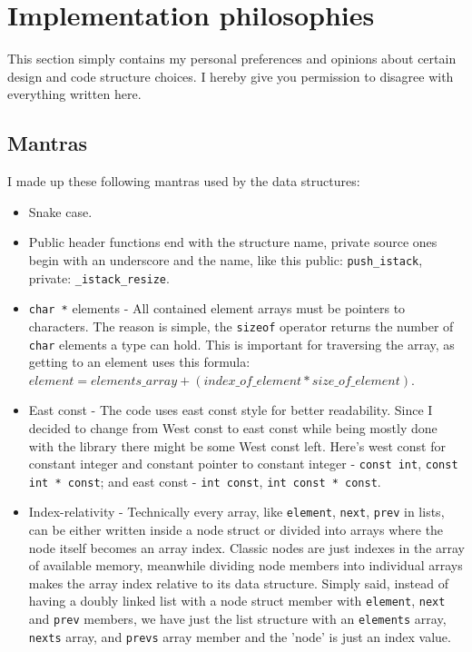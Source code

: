 \section{Implementation philosophies}

This section simply contains my personal preferences and opinions about certain design and code structure choices. I hereby give you permission to disagree with everything written here.

\subsection{Mantras}

I made up these following mantras used by the data structures:

\begin{itemize}
    \item Snake case.
    \item Public header functions end with the structure name, private source ones begin with an underscore and the name, like this public: \texttt{push\_istack}, private: \texttt{\_istack\_resize}.
    \item \texttt{char *} elements - All contained element arrays must be pointers to characters. The reason is simple, the \texttt{sizeof} operator returns the number of \texttt{char} elements a type can hold. This is important for traversing the array, as getting to an element uses this formula: \(element = elements\_array + (index\_of\_element * size\_of\_element)\).
    \item East const - The code uses east const style for better readability. Since I decided to change from West const to east const while being mostly done with the library there might be some West const left. Here's west const for constant integer and constant pointer to constant integer - \texttt{const int}, \texttt{const int * const}; and east const - \texttt{int const}, \texttt{int const * const}.
    \item Index-relativity - Technically every array, like \texttt{element}, \texttt{next}, \texttt{prev} in lists, can be either written inside a node struct or divided into arrays where the node itself becomes an array index. Classic nodes are just indexes in the array of available memory, meanwhile dividing node members into individual arrays makes the array index relative to its data structure. Simply said, instead of having a doubly linked list with a node struct member with \texttt{element}, \texttt{next} and \texttt{prev} members, we have just the list structure with an \texttt{elements} array, \texttt{nexts} array, and \texttt{prevs} array member and the 'node' is just an index value.
\end{itemize}

